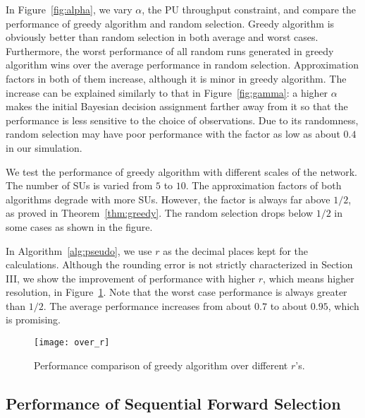 \documentclass[conference]{IEEEtran}
\begin{document}
In Figure~\ref{fig:alpha}, we vary $\alpha$, the PU throughput constraint, and compare the performance of greedy algorithm and random selection. Greedy algorithm is obviously better than random selection in both average and worst cases. Furthermore, the worst performance of all random runs generated in greedy algorithm wins over the average performance in random selection. Approximation factors in both of them increase, although it is minor in greedy algorithm. The increase can be explained similarly to that in Figure~\ref{fig:gamma}: a higher $\alpha$ makes the initial Bayesian decision assignment farther away from it so that the performance is less sensitive to the choice of observations. Due to its randomness, random selection may have poor performance with the factor as low as about $0.4$ in our simulation. 

We test the performance of greedy algorithm with different scales of the network. The number of SUs is varied from $5$ to $10$. The approximation factors of both algorithms degrade with more SUs. However, the factor is always far above $1/2$, as proved in Theorem~\ref{thm:greedy}. The random selection drops below $1/2$ in some cases as shown in the figure.   

In Algorithm~\ref{alg:pseudo}, we use $r$ as the decimal places kept for the calculations. Although the rounding error is not strictly characterized in Section III, we show the improvement of performance with higher $r$, which means higher resolution, in Figure~\ref{fig:r}. Note that the worst case performance is always greater than $1/2$. The average performance increases from about $0.7$ to about $0.95$, which is promising.   

\begin{figure}[tb]
    \begin{center}
    \setlength{\unitlength}{1in}
    \texttt{[image: over\_r]}
    \end{center}
\vspace{-1.5em}
\caption{Performance comparison of greedy algorithm over different $r$'s.}
\vspace{-1.2em}
\label{fig:r}
\end{figure}

\subsection{Performance of Sequential Forward Selection}
\label{subsec:CD}
\end{document}
